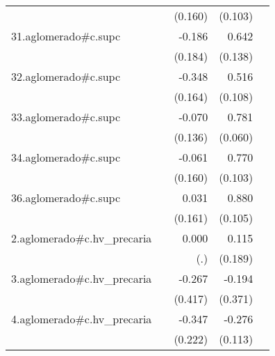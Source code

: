 {\begin{longtable}{l*{4}{D{.}{.}{-1}}}
            &                     &     (0.160)         &     (0.103)         &                     \\
\addlinespace
31.aglomerado#c.supc&                     &      -0.186         &       0.642\sym{***}&                     \\
            &                     &     (0.184)         &     (0.138)         &                     \\
\addlinespace
32.aglomerado#c.supc&                     &      -0.348\sym{*}  &       0.516\sym{***}&                     \\
            &                     &     (0.164)         &     (0.108)         &                     \\
\addlinespace
33.aglomerado#c.supc&                     &      -0.070         &       0.781\sym{***}&                     \\
            &                     &     (0.136)         &     (0.060)         &                     \\
\addlinespace
34.aglomerado#c.supc&                     &      -0.061         &       0.770\sym{***}&                     \\
            &                     &     (0.160)         &     (0.103)         &                     \\
\addlinespace
36.aglomerado#c.supc&                     &       0.031         &       0.880\sym{***}&                     \\
            &                     &     (0.161)         &     (0.105)         &                     \\
\addlinespace
2.aglomerado#c.hv\_precaria&                     &       0.000         &       0.115         &                     \\
            &                     &         (.)         &     (0.189)         &                     \\
\addlinespace
3.aglomerado#c.hv\_precaria&                     &      -0.267         &      -0.194         &                     \\
            &                     &     (0.417)         &     (0.371)         &                     \\
\addlinespace
4.aglomerado#c.hv\_precaria&                     &      -0.347         &      -0.276\sym{*}  &                     \\
            &                     &     (0.222)         &     (0.113)         &                     \\

\end{longtable}}

